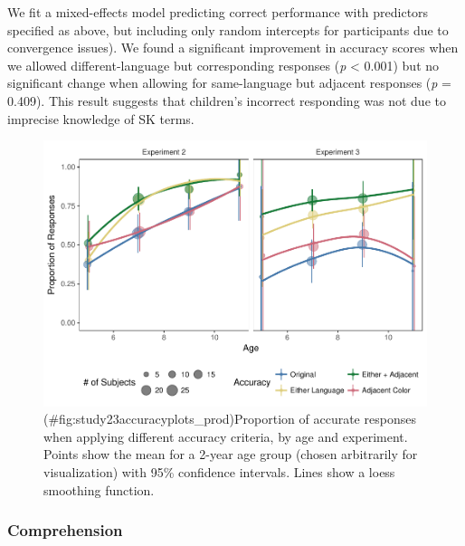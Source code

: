 \documentclass[
  english,
  ,man,floatsintext]{apa6}
\begin{document}
We fit a mixed-effects model predicting correct performance with predictors specified as above, but including only random intercepts for participants due to convergence issues). We found a significant improvement in accuracy scores when we allowed different-language but corresponding responses (\emph{p} \textless{} 0.001) but no significant change when allowing for same-language but adjacent responses (\emph{p} = 0.409). This result suggests that children's incorrect responding was not due to imprecise knowledge of SK terms.

\begin{figure}
\centering
\includegraphics{amazon_color_files/figure-latex/study23accuracyplots_prod-1.pdf}
\caption{(\#fig:study23accuracyplots\_prod)Proportion of accurate responses when applying different accuracy criteria, by age and experiment. Points show the mean for a 2-year age group (chosen arbitrarily for visualization) with 95\% confidence intervals. Lines show a loess smoothing function.}
\end{figure}

\hypertarget{comprehension}{%
\subsubsection{Comprehension}\label{comprehension}}
\end{document}
